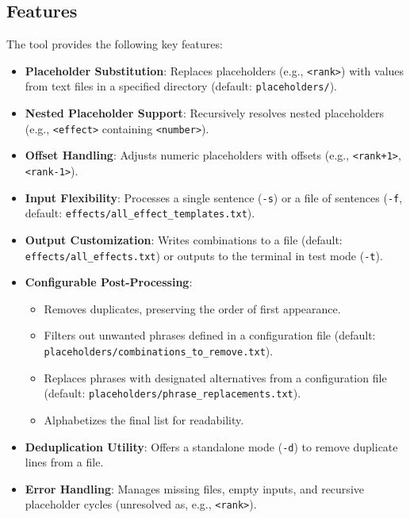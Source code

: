 \subsection{Features}
The tool provides the following key features:
\begin{itemize}
    \item \textbf{Placeholder Substitution}: Replaces placeholders (e.g., \texttt{<rank>}) with values from text files in a specified directory (default: \texttt{placeholders/}).
    \item \textbf{Nested Placeholder Support}: Recursively resolves nested placeholders (e.g., \texttt{<effect>} containing \texttt{<number>}).
    \item \textbf{Offset Handling}: Adjusts numeric placeholders with offsets (e.g., \texttt{<rank+1>}, \texttt{<rank-1>}).
    \item \textbf{Input Flexibility}: Processes a single sentence (\texttt{-s}) or a file of sentences (\texttt{-f}, default: \texttt{effects/all\_effect\_templates.txt}).
    \item \textbf{Output Customization}: Writes combinations to a file (default: \texttt{effects/all\_effects.txt}) or outputs to the terminal in test mode (\texttt{-t}).
    \item \textbf{Configurable Post-Processing}:
        \begin{itemize}
            \item Removes duplicates, preserving the order of first appearance.
            \item Filters out unwanted phrases defined in a configuration file (default: \texttt{placeholders/combinations\_to\_remove.txt}).
            \item Replaces phrases with designated alternatives from a configuration file (default: \texttt{placeholders/phrase\_replacements.txt}).
            \item Alphabetizes the final list for readability.
        \end{itemize}
    \item \textbf{Deduplication Utility}: Offers a standalone mode (\texttt{-d}) to remove duplicate lines from a file.
    \item \textbf{Error Handling}: Manages missing files, empty inputs, and recursive placeholder cycles (unresolved as, e.g., \texttt{<rank>}).
\end{itemize}

